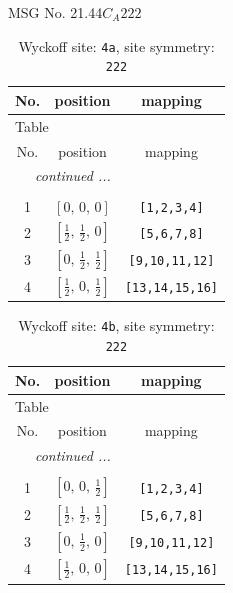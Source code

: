 \documentclass[fleqn,8pt]{jsarticle}
\begin{document}
\setcounter{MaxMatrixCols}{32}

\renewcommand{\tablename}{Table~}
\renewcommand{\figurename}{Figure~}
\begin{center}
\LARGE
MSG No. 21.44\quad$C_{A}222$
\end{center}
\renewcommand{\arraystretch}{1.2}
\begin{longtable}{ccc}
\caption{Wyckoff site: {\tt 4a}, site symmetry: {\tt 222}}
 \\
 \hline \hline
No. & position & mapping \\ \hline \endfirsthead

\multicolumn{2}{l}{\tablename\ \thetable{}} \\
 \hline \hline
No. & position & mapping \\ \hline \endhead

 \hline \hline
\multicolumn{2}{r}{\footnotesize\it continued ...} \\ \endfoot

 \hline \hline
\multicolumn{2}{r}{} \\ \endlastfoot

1 & $\left[ 0,\, 0,\, 0 \right]$ & {\tt [1,2,3,4]} \\ \hline
2 & $\left[ \frac{1}{2},\, \frac{1}{2},\, 0 \right]$ & {\tt [5,6,7,8]} \\ \hline
3 & $\left[ 0,\, \frac{1}{2},\, \frac{1}{2} \right]$ & {\tt [9,10,11,12]} \\ \hline
4 & $\left[ \frac{1}{2},\, 0,\, \frac{1}{2} \right]$ & {\tt [13,14,15,16]} \\
\end{longtable}
\renewcommand{\arraystretch}{1.2}
\begin{longtable}{ccc}
\caption{Wyckoff site: {\tt 4b}, site symmetry: {\tt 222}}
 \\
 \hline \hline
No. & position & mapping \\ \hline \endfirsthead

\multicolumn{2}{l}{\tablename\ \thetable{}} \\
 \hline \hline
No. & position & mapping \\ \hline \endhead

 \hline \hline
\multicolumn{2}{r}{\footnotesize\it continued ...} \\ \endfoot

 \hline \hline
\multicolumn{2}{r}{} \\ \endlastfoot

1 & $\left[ 0,\, 0,\, \frac{1}{2} \right]$ & {\tt [1,2,3,4]} \\ \hline
2 & $\left[ \frac{1}{2},\, \frac{1}{2},\, \frac{1}{2} \right]$ & {\tt [5,6,7,8]} \\ \hline
3 & $\left[ 0,\, \frac{1}{2},\, 0 \right]$ & {\tt [9,10,11,12]} \\ \hline
4 & $\left[ \frac{1}{2},\, 0,\, 0 \right]$ & {\tt [13,14,15,16]} \\
\end{longtable}
\end{document}
